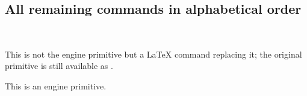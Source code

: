 
\subsection{All remaining commands in alphabetical order}


\begin{function}[user]
  {
    \!
  }
  \begin{syntax}
    \cs{!}
  \end{syntax}

\end{function}



\begin{function}[]
  {
    \*
  }
  \begin{syntax}
    \cs{*}
  \end{syntax}

\end{function}



\begin{function}[]
  {
    \+
  }
  \begin{syntax}
    \cs{+}
  \end{syntax}

\end{function}



\begin{function}[]
  {
    \,
  }
  \begin{syntax}
    \cs{,}
  \end{syntax}

\end{function}



\begin{function}[]
  {
    \-
  }
  \begin{syntax}
    \cs{-}
  \end{syntax}
  This is not the engine primitive \cs{-} but a \LaTeX{} command replacing
  it; the original primitive is still available as .
\end{function}



\begin{function}[]
  {
    \/
  }
  \begin{syntax}
    \cs{/}
  \end{syntax}
  This is an engine primitive.
\end{function}




